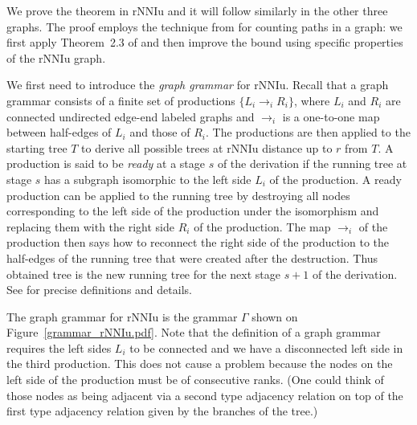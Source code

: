 \documentclass{amsart}
\theoremstyle{definition}
\newcommand{\rnniu}{\mathrm{rNNIu}}
\begin{document}
\proof
We prove the theorem in $\rnniu$ and it will follow similarly in the other three graphs.
The proof employs the technique from \autocite{Sleator1992-bp} for counting paths in a graph: we first apply Theorem~2.3 of \textcite{Sleator1992-bp} and then improve the bound using specific properties of the $\rnniu$ graph.

We first need to introduce the \emph{graph grammar} for $\rnniu$.
Recall that a graph grammar consists of a finite set of productions $\{L_i \to_i R_i\}$, where $L_i$ and $R_i$ are connected undirected edge-end labeled graphs and $\to_i$ is a one-to-one map between half-edges of $L_i$ and those of $R_i$.
The productions are then applied to the starting tree $T$ to derive all possible trees at $\rnniu$ distance up to $r$ from $T$.
A production is said to be \emph{ready} at a stage $s$ of the derivation if the running tree at stage $s$ has a subgraph isomorphic to the left side $L_i$ of the production.
A ready production can be applied to the running tree by destroying all nodes corresponding to the left side of the production under the isomorphism and replacing them with the right side $R_i$ of the production.
The map $\to_i$ of the production then says how to reconnect the right side of the production to the half-edges of the running tree that were created after the destruction.
Thus obtained tree is the new running tree for the next stage $s+1$ of the derivation.
See \autocite{Sleator1992-bp} for precise definitions and details.

The graph grammar for $\rnniu$ is the grammar $\Gamma$ shown on Figure~\ref{grammar_rNNIu.pdf}.
Note that the definition of a graph grammar requires the left sides $L_i$ to be connected and we have a disconnected left side in the third production.
This does not cause a problem because the nodes on the left side of the production must be of consecutive ranks.
(One could think of those nodes as being adjacent via a second type adjacency relation on top of the first type adjacency relation given by the branches of the tree.)
\end{document}
